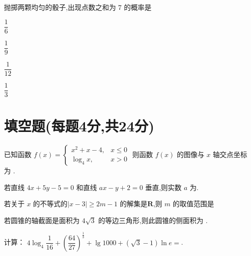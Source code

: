 \documentclass{exam-zh}
\begin{document}
    \begin{question}
    抛掷两颗均匀的骰子,出现点数之和为 $7$ 的概率是\paren[A]
    \begin{choices}
        \item $\dfrac{1}{6}$
        \item $\dfrac{1}{9}$
        \item $\dfrac{1}{12}$
        \item $\dfrac{1}{3}$
    \end{choices}
    \end{question}
    









\section{填空题(每题4分,共24分)}

\begin{question}
    已知函数 
    \(
    f(x)=
    \begin{cases}
        x^2 + x - 4, & x \leq 0 \\
        \log_{4}x, & x > 0
    \end{cases}
    \)
    则函数 $f(x)$ 的图像与 $x$ 轴交点坐标为 \fillin[$(1,0)$].
\end{question}
\begin{question}
    若直线 $4x + 5y - 5 = 0$ 和直线 $ax - y + 2 = 0$ 垂直,则实数 $a$ 为\fillin[$$].
\end{question}
\begin{question}
 若关于 $x$ 的不等式的$|x-3| \ge 2m -1$ 的解集是$$,则 $m$ 的取值范围是\fillin[${(-\infty,])}$]
\end{question}
\begin{question}
    若圆锥的轴截面是面积为 $4$ 的等边三角形,则此圆锥的侧面积为 \fillin[$8\pi$].
\end{question}
\begin{question}
    计算：
    \(
    4\log_{4}\dfrac{1}{16}+\left(\dfrac{64}{27}\right)^{\frac{1}{3}}+\lg1000+(\sqrt{3} - 1)\ln e=
    \).
\end{question}
\end{document}
